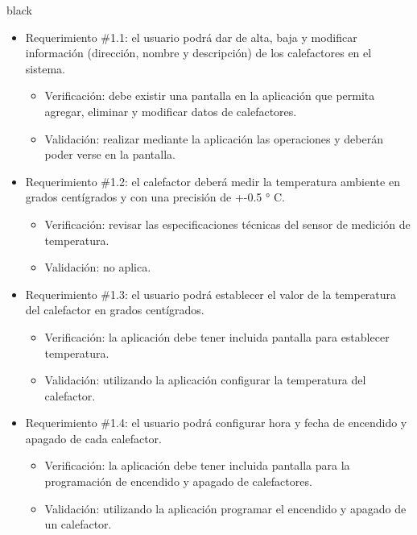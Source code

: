 \documentclass[
11pt, %
codirector, %
]{charter}
\begin{document}
\begin{consigna}{black}

\begin{itemize} 
\item Requerimiento \#1.1: el usuario podrá dar de alta, baja y modificar información (dirección, nombre
y descripción) de los calefactores en el sistema.

\begin{itemize}
	\item Verificación: debe existir una pantalla en la aplicación que permita agregar, eliminar y modificar datos de calefactores. 
	\item Validación: realizar mediante la aplicación las operaciones y deberán poder verse en la pantalla.
\end{itemize}

\item Requerimiento \#1.2: el calefactor deberá medir la temperatura ambiente en grados centígrados y con una
precisión de +-0.5 ° C.

\begin{itemize}
	\item Verificación: revisar las especificaciones técnicas del sensor de medición de temperatura. 
	\item Validación: no aplica.
\end{itemize}


\item Requerimiento \#1.3: el usuario podrá establecer el valor de la temperatura del calefactor en grados centígrados.

\begin{itemize}
	\item Verificación: la aplicación debe tener incluida pantalla para establecer temperatura.
	\item Validación: utilizando la aplicación configurar la temperatura del calefactor.
\end{itemize}

\item Requerimiento \#1.4: el usuario podrá configurar hora y fecha de encendido y apagado de cada calefactor.

\begin{itemize}
	\item Verificación: la aplicación debe tener incluida pantalla para la programación de encendido y apagado de calefactores.
	\item Validación: utilizando la aplicación programar el encendido y apagado de un calefactor.
\end{itemize}


\end{itemize}
\end{consigna}
\end{document}
